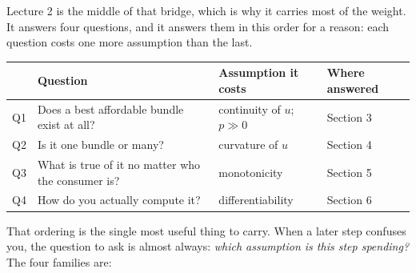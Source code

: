 \documentclass[11pt]{article}
\theoremstyle{definition}
\newcommand{\pref}{\succsim}
\newcommand{\xs}{x^*}
\begin{document}
\begin{center}
\end{center}

\vspace{4pt}
Lecture 2 is the middle of that bridge, which is why it carries most of the weight. It
answers four questions, and it answers them in this order for a reason: each question costs
one more assumption than the last.

\begin{center}
\begin{tabular}{@{}p{0.5cm}p{6.4cm}p{3.5cm}p{3.6cm}@{}}
\toprule
& \textbf{Question} & \textbf{Assumption it costs} & \textbf{Where answered} \\
\midrule
Q1 & Does a best affordable bundle exist at all? & continuity of $u$; $p\gg0$ & Section 3 \\[3pt]
Q2 & Is it one bundle or many? & curvature of $u$ & Section 4 \\[3pt]
Q3 & What is true of it no matter who the consumer is? & monotonicity & Section 5 \\[3pt]
Q4 & How do you actually compute it? & differentiability & Section 6 \\
\bottomrule
\end{tabular}
\end{center}

\vspace{5pt}
That ordering is the single most useful thing to carry. When a later step confuses you, the
question to ask is almost always: \emph{which assumption is this step spending?} The four
families are:
\end{document}
